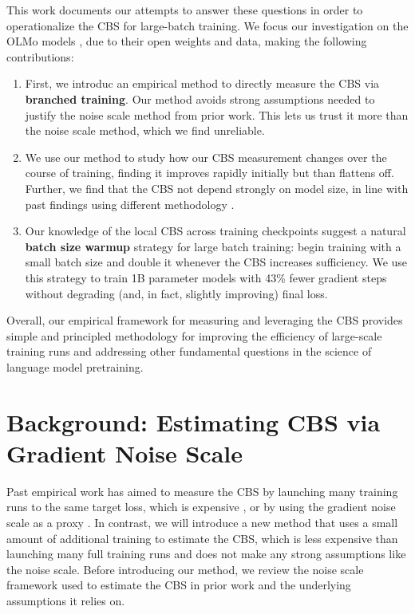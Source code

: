\documentclass{article}
\begin{document}
This work documents our attempts to answer these questions in order to operationalize the CBS for large-batch training.
We focus our investigation on the OLMo models \citep{groeneveld-etal-2024-olmo,olmo20252olmo2furious}, due to their open weights and data, making the following contributions:

\begin{enumerate}
    \item First, we introduc an empirical method to directly measure the CBS via \textbf{branched training}. Our method avoids strong assumptions needed to justify the noise scale method from prior work. This lets us trust it more than the noise scale method, which we find unreliable.
    \item We use our method to study how our CBS measurement changes over the course of training, finding it improves rapidly initially but than flattens off. Further, we find that the CBS not depend strongly on model size, in line with past findings using different methodology \citep{zhang2024cbs}.
    \item Our knowledge of the local CBS across training checkpoints suggest a natural \textbf{batch size warmup} strategy for large batch training: begin training with a small batch size and double it whenever the CBS increases sufficiency. We use this strategy to train 1B parameter models with 43\% fewer gradient steps without degrading (and, in fact, slightly improving) final loss.
\end{enumerate}
Overall, our empirical framework for measuring and leveraging the CBS provides simple and principled methodology for improving the efficiency of large-scale training runs and addressing other fundamental questions in the science of language model pretraining.


\section{Background: Estimating CBS via Gradient Noise Scale} 
\label{sec:noise-scale}

Past empirical work has aimed to measure the CBS by 
launching many training runs to the same target loss, which is expensive \citep{zhang-2019-algorithmic,zhang2024cbs},
or by using the gradient noise scale as a proxy \citep{mccandlish2018empirical,gray2023efficient,gray2024normalization}. 
In contrast, we will introduce a new method that uses a small amount of additional training to estimate the CBS, which is less expensive than launching many full training runs and does not make any strong assumptions like the noise scale.
Before introducing our method, we review the noise scale framework used to estimate the CBS in prior work and the underlying assumptions it relies on.
\end{document}
